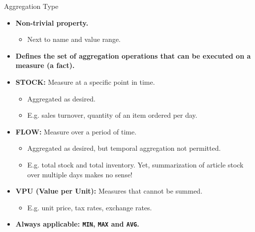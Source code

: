 \begin{frame}{Aggregation Type}
	\begin{itemize}
		\item \textbf{Non-trivial property.}
		      \begin{itemize}
			      \item Next to name and value range.
		      \end{itemize}
		\item \textbf{Defines the set of aggregation operations that can be executed on a measure (a fact).}
		\item \textbf{\color{airforceblue}STOCK:} Measure at a specific point in time.
		      \begin{itemize}
			      \item Aggregated as desired.
			      \item E.g. sales turnover, quantity of an item ordered per day.
		      \end{itemize}
		\item \textbf{\color{airforceblue}FLOW:} Measure over a period of time.
		      \begin{itemize}
			      \item Aggregated as desired, but temporal aggregation not permitted.
			      \item E.g. total stock and total inventory. Yet, summarization of article stock over multiple days makes no sense!
		      \end{itemize}
		\item \textbf{\color{airforceblue}VPU (Value per Unit):} Measures that cannot be summed.
		      \begin{itemize}
			      \item E.g. unit price, tax rates, exchange rates.
		      \end{itemize}
		\item \textbf{Always applicable: \texttt{MIN}, \texttt{MAX} and \texttt{AVG}.}
	\end{itemize}
\end{frame}

